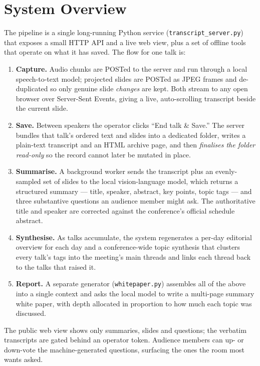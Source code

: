 \documentclass[11pt]{article}
\begin{document}
\section{System Overview}
The pipeline is a single long-running Python service (\texttt{transcript\_server.py})
that exposes a small HTTP API and a live web view, plus a set of offline tools
that operate on what it has saved. The flow for one talk is:

\begin{enumerate}[leftmargin=1.4em,itemsep=0.15em]
  \item \textbf{Capture.} Audio chunks are POSTed to the server and run through a
        local speech-to-text model; projected slides are POSTed as JPEG frames
        and de-duplicated so only genuine slide \emph{changes} are kept. Both
        stream to any open browser over Server-Sent Events, giving a live,
        auto-scrolling transcript beside the current slide.
  \item \textbf{Save.} Between speakers the operator clicks ``End talk \& Save.''
        The server bundles that talk's ordered text and slides into a dedicated
        folder, writes a plain-text transcript and an HTML archive page, and then
        \emph{finalises the folder read-only} so the record cannot later be
        mutated in place.
  \item \textbf{Summarise.} A background worker sends the transcript plus an
        evenly-sampled set of slides to the local vision-language model, which
        returns a structured summary --- title, speaker, abstract, key points,
        topic tags --- and three substantive questions an audience member might
        ask. The authoritative title and speaker are corrected against the
        conference's official schedule abstract.
  \item \textbf{Synthesise.} As talks accumulate, the system regenerates a
        per-day editorial overview for each day and a conference-wide topic
        synthesis that clusters every talk's tags into the meeting's main
        threads and links each thread back to the talks that raised it.
  \item \textbf{Report.} A separate generator (\texttt{whitepaper.py}) assembles
        all of the above into a single context and asks the local model to write
        a multi-page summary white paper, with depth allocated in proportion to
        how much each topic was discussed.
\end{enumerate}

The public web view shows only summaries, slides and questions; the verbatim
transcripts are gated behind an operator token. Audience members can up- or
down-vote the machine-generated questions, surfacing the ones the room most wants
asked.
\end{document}
